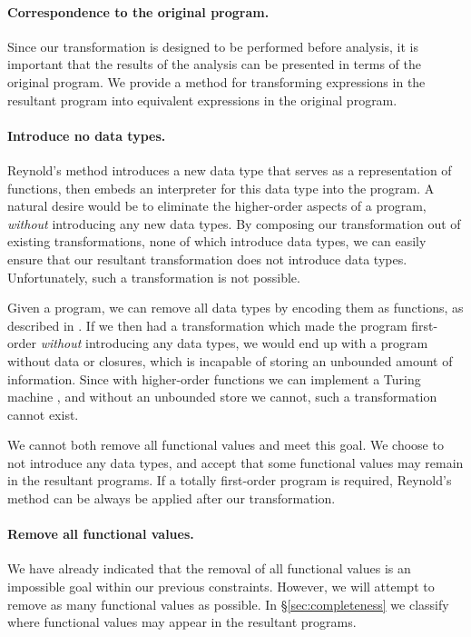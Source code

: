 \documentclass[preprint]{sigplanconf}
\begin{document}
\paragraph{Correspondence to the original program.} Since our transformation is designed to be performed before analysis, it is important that the results of the analysis can be presented in terms of the original program. We provide a method for transforming expressions in the resultant program into equivalent expressions in the original program.

\paragraph{Introduce no data types.} Reynold's method introduces a new data type that serves as a representation of functions, then embeds an interpreter for this data type into the program. A natural desire would be to eliminate the higher-order aspects of a program, \textit{without} introducing any new data types. By composing our transformation out of existing transformations, none of which introduce data types, we can easily ensure that our resultant transformation does not introduce data types. Unfortunately, such a transformation is not possible.

Given a program, we can remove all data types by encoding them as functions, as described in \citet{naylor:reduceron}. If we then had a transformation which made the program first-order \textit{without} introducing any data types, we would end up with a program without data or closures, which is incapable of storing an unbounded amount of information. Since with higher-order functions we can implement a Turing machine \cite{turing:halting}, and without an unbounded store we cannot, such a transformation cannot exist.

We cannot both remove all functional values and meet this goal. We choose to not introduce any data types, and accept that some functional values may remain in the resultant programs. If a totally first-order program is required, Reynold's method can be always be applied after our transformation.

\paragraph{Remove all functional values.} We have already indicated that the removal of all functional values is an impossible goal within our previous constraints. However, we will attempt to remove as many functional values as possible. In \S\ref{sec:completeness} we classify where functional values may appear in the resultant programs.
\end{document}
